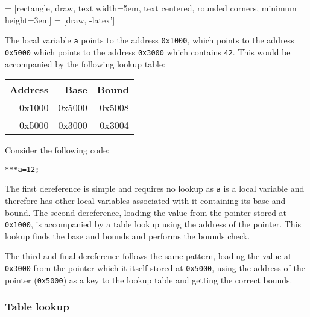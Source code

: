 \noindent
{} = [rectangle, draw, 
    text width=5em, text centered, rounded corners, minimum height=3em]
 = [draw, -latex']

The local variable \verb!a! points to the address \verb!0x1000!, which points to the address \verb!0x5000! which points to the address \verb!0x3000! which contains \verb!42!. This would be accompanied by the following lookup table:

\noindent
\begin{tabular}{|r|r|r|}
\hline Address & Base & Bound \\
\hline 0x1000 & 0x5000 & 0x5008 \\
\hline 0x5000 & 0x3000 & 0x3004 \\
\hline
\end{tabular}

Consider the following code:

\begin{verbatim}
***a=12;
\end{verbatim}

The first dereference is simple and requires no lookup as \verb!a! is a local variable and therefore has other local variables associated with it containing its base and bound.
The second dereference, loading the value from the pointer stored at \verb!0x1000!, is accompanied by a table lookup using the address of the pointer.
This lookup finds the base and bounds and performs the bounds check.

The third and final dereference follows the same pattern, loading the value at \verb!0x3000! from the pointer which it itself stored at \verb!0x5000!, using the address of the pointer (\verb!0x5000!) as a key to the lookup table and getting the correct bounds.

\subsubsection{Table lookup}


